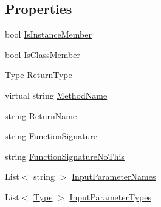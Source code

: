 \subsection*{Properties}
\begin{DoxyCompactItemize}
\item 
bool \hyperlink{classi_c_s___method_base_info_a63780da65daffae3af039a05cc7592b7}{Is\+Instance\+Member}
\item 
bool \hyperlink{classi_c_s___method_base_info_abc811345b9f461b1d8b99d60352d90d7}{Is\+Class\+Member}
\item 
\hyperlink{i_c_s___object_type_enum_8cs_ae6c3dd6d8597380b56d94908eb431547aa1fa27779242b4902f7ae3bdd5c6d508}{Type} \hyperlink{classi_c_s___method_base_info_a36e087cac5bad196cd40fa640c8f0889}{Return\+Type}
\item 
virtual string \hyperlink{classi_c_s___method_base_info_a6c07c29fa728fca926642c5abc4a47a3}{Method\+Name}
\item 
string \hyperlink{classi_c_s___method_base_info_ad7ea43c3a367b2b1da935e2b895330a6}{Return\+Name}
\item 
string \hyperlink{classi_c_s___method_base_info_a9dac4594746435786234353626620a0e}{Function\+Signature}
\item 
string \hyperlink{classi_c_s___method_base_info_ac4ab09e600a55c81d9d4a748123ce2be}{Function\+Signature\+No\+This}
\item 
List$<$ string $>$ \hyperlink{classi_c_s___method_base_info_aa6d84e9dc89f2b96fd3e93e347015f5a}{Input\+Parameter\+Names}
\item 
List$<$ \hyperlink{i_c_s___object_type_enum_8cs_ae6c3dd6d8597380b56d94908eb431547aa1fa27779242b4902f7ae3bdd5c6d508}{Type} $>$ \hyperlink{classi_c_s___method_base_info_a8b093f052e8a4fa6919edcc3f6bb37f5}{Input\+Parameter\+Types}

\end{DoxyCompactItemize}
